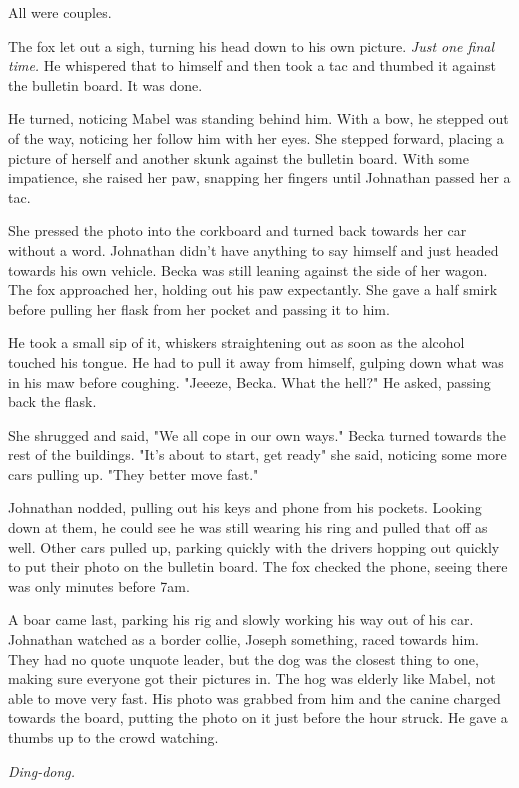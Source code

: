 All were couples.

The fox let out a sigh, turning his head down to his own picture. \emph{Just one final time.} He whispered that to himself and then took a tac and thumbed it against the bulletin board. It was done.

He turned, noticing Mabel was standing behind him. With a bow, he stepped out of the way, noticing her follow him with her eyes. She stepped forward, placing a picture of herself and another skunk against the bulletin board. With some impatience, she raised her paw, snapping her fingers until Johnathan passed her a tac.

She pressed the photo into the corkboard and turned back towards her car without a word. Johnathan didn't have anything to say himself and just headed towards his own vehicle. Becka was still leaning against the side of her wagon. The fox approached her, holding out his paw expectantly. She gave a half smirk before pulling her flask from her pocket and passing it to him.

He took a small sip of it, whiskers straightening out as soon as the alcohol touched his tongue. He had to pull it away from himself, gulping down what was in his maw before coughing. "Jeeeze, Becka. What the hell?" He asked, passing back the flask.

She shrugged and said, "We all cope in our own ways." Becka turned towards the rest of the buildings. "It's about to start, get ready" she said, noticing some more cars pulling up. "They better move fast."

Johnathan nodded, pulling out his keys and phone from his pockets. Looking down at them, he could see he was still wearing his ring and pulled that off as well. Other cars pulled up, parking quickly with the drivers hopping out quickly to put their photo on the bulletin board. The fox checked the phone, seeing there was only minutes before 7am.

A boar came last, parking his rig and slowly working his way out of his car. Johnathan watched as a border collie, Joseph something, raced towards him. They had no quote unquote leader, but the dog was the closest thing to one, making sure everyone got their pictures in. The hog was elderly like Mabel, not able to move very fast. His photo was grabbed from him and the canine charged towards the board, putting the photo on it just before the hour struck. He gave a thumbs up to the crowd watching.

\emph{Ding-dong.}

